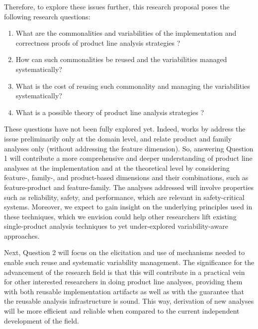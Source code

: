 Therefore, to explore these issues further, this research proposal poses the following research questions:

\begin{enumerate}
  \item  What are the commonalities and variabilities of the implementation and correctness proofs of product line analysis strategies ?
  \item  How can such commonalities be reused and the variabilities managed systematically?
  \item  What is the cost of reusing such commonality and managing the variabilities systematically?
  \item  What is a possible theory of product line analysis strategies ?
\end{enumerate}

These questions have not been fully explored yet. Indeed, works by \cite{Thum2014} address the issue preliminarily only at the domain level, and \cite{Midtgaard2015} relate product and family analyses only (without addressing the feature dimension). So, answering Question 1 will contribute a more comprehensive and deeper understanding of product line analyses at the implementation and at the theoretical level by considering feature-, family-, and product-based dimensions and their combinations, such as feature-product and feature-family. The analyses addressed will involve properties such as reliability, safety, and performance, which are relevant in safety-critical systems.
Moreover, we expect to gain insight on the underlying principles used in these techniques, which we envision could help other researchers lift existing single-product analysis techniques to yet under-explored variability-aware approaches.

Next, Question 2 will focus on the elicitation and use of mechanisms needed to enable such reuse and systematic variability management.  The significance for the advancement of the research field is that this will contribute in a practical vein for other interested researchers in doing product line analyses, providing them with both reusable implementation artifacts as well as with the guarantee that the reusable analysis infrastructure is sound. This way, derivation of new analyses will be more efficient and reliable when compared to the current independent development of the field.

